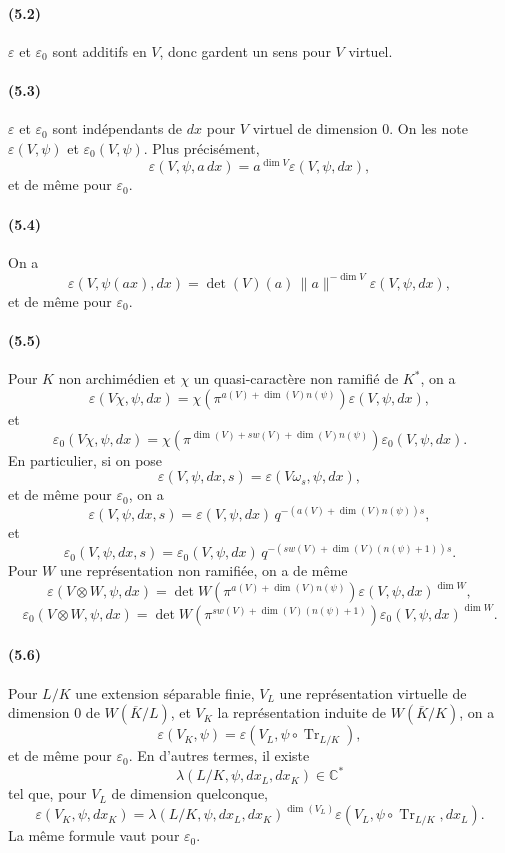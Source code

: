\documentclass[10pt,letterpaper]{article}
\newcommand{\C}{\mathbb C}
\newcommand{\Tr}{\operatorname{Tr}}
\providecommand{\Tr}{\operatorname{Tr}}
\providecommand{\Tr}{\operatorname{Tr}}
\providecommand{\Tr}{\operatorname{Tr}}
\begin{document}
\paragraph{(5.2)} \(\varepsilon\) et \(\varepsilon_0\) sont additifs en \(V\), donc gardent un sens pour \(V\) virtuel.

\paragraph{(5.3)} \(\varepsilon\) et \(\varepsilon_0\) sont indépendants de \(dx\) pour \(V\) virtuel de dimension \(0\). On les note \(\varepsilon(V,\psi)\) et \(\varepsilon_0(V,\psi)\). Plus précisément,
\[
\varepsilon(V,\psi,a\,dx)=a^{\dim V}\varepsilon(V,\psi,dx),
\]
et de même pour \(\varepsilon_0\).

\paragraph{(5.4)} On a
\[
\varepsilon(V,\psi(ax),dx)
=
\det(V)(a)\,\|a\|^{-\dim V}\varepsilon(V,\psi,dx),
\]
et de même pour \(\varepsilon_0\).

\paragraph{(5.5)} Pour \(K\) non archimédien et \(\chi\) un quasi-caractère non ramifié de \(K^*\), on a
\[
\tag{5.5.1}
\varepsilon(V\chi,\psi,dx)
=
\chi\!\left(\pi^{a(V)+\dim(V)n(\psi)}\right)\varepsilon(V,\psi,dx),
\]
et
\[
\varepsilon_0(V\chi,\psi,dx)
=
\chi\!\left(\pi^{\dim(V)+sw(V)+\dim(V)n(\psi)}\right)
\varepsilon_0(V,\psi,dx).
\]
En particulier, si on pose
\[
\varepsilon(V,\psi,dx,s)=\varepsilon(V\omega_s,\psi,dx),
\]
et de même pour \(\varepsilon_0\), on a
\[
\tag{5.5.2}
\varepsilon(V,\psi,dx,s)
=
\varepsilon(V,\psi,dx)\,
q^{-(a(V)+\dim(V)n(\psi))s},
\]
et
\[
\varepsilon_0(V,\psi,dx,s)
=
\varepsilon_0(V,\psi,dx)\,
q^{-(sw(V)+\dim(V)(n(\psi)+1))s}.
\]
Pour \(W\) une représentation non ramifiée, on a de même
\[
\tag{5.5.3}
\varepsilon(V\otimes W,\psi,dx)
=
\det W\!\left(\pi^{a(V)+\dim(V)n(\psi)}\right)
\varepsilon(V,\psi,dx)^{\dim W},
\]
\[
\varepsilon_0(V\otimes W,\psi,dx)
=
\det W\!\left(\pi^{sw(V)+\dim(V)(n(\psi)+1)}\right)
\varepsilon_0(V,\psi,dx)^{\dim W}.
\]

\paragraph{(5.6)} Pour \(L/K\) une extension séparable finie, \(V_L\) une représentation virtuelle de dimension \(0\) de \(W(\overline K/L)\), et \(V_K\) la représentation induite de \(W(\overline K/K)\), on a
\[
\tag{5.6.1}
\varepsilon(V_K,\psi)=\varepsilon(V_L,\psi\circ\Tr_{L/K}),
\]
et de même pour \(\varepsilon_0\). En d'autres termes, il existe
\[
\lambda(L/K,\psi,dx_L,dx_K)\in\C^*
\]
tel que, pour \(V_L\) de dimension quelconque,
\[
\tag{5.6.2}
\varepsilon(V_K,\psi,dx_K)
=
\lambda(L/K,\psi,dx_L,dx_K)^{\dim(V_L)}
\varepsilon(V_L,\psi\circ\Tr_{L/K},dx_L).
\]
La même formule vaut pour \(\varepsilon_0\).
\end{document}
